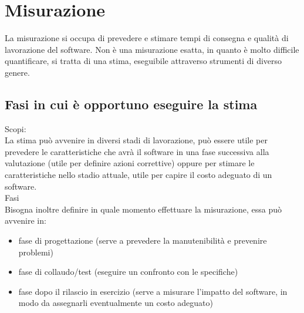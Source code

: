 \documentclass[a4paper,12pt]{report}
\begin{document}
	\section{Misurazione}
	La misurazione si occupa di prevedere e stimare tempi di consegna e qualità di lavorazione del software. Non è una misurazione esatta, in quanto è molto difficile quantificare, si tratta di una stima, eseguibile attraverso strumenti di diverso genere.
	\subsection{Fasi in cui è opportuno eseguire la stima}
	Scopi:\\
	La stima può avvenire in diversi stadi di lavorazione, può essere utile per prevedere le caratteristiche che avrà il software in una fase successiva alla valutazione (utile per definire azioni correttive) oppure per stimare le caratteristiche nello stadio attuale, utile per capire il costo adeguato di un software. \\
	Fasi \\
	Bisogna inoltre definire in quale momento effettuare la misurazione, essa può avvenire in:
	\begin{itemize}
		\item fase di progettazione (serve a prevedere la manutenibilità e prevenire problemi)
		\item fase di collaudo/test (eseguire un confronto con le specifiche)
		\item fase dopo il rilascio in esercizio (serve a misurare l'impatto del software, in modo da assegnarli eventualmente un costo adeguato)
	\end{itemize}
	\newpage
\end{document}
